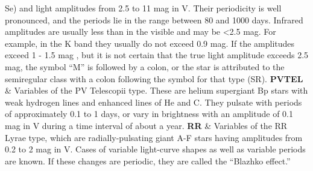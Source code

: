 \begin{longtabu}
Se) and light amplitudes from 2.5 to 11 mag in V. Their periodicity is
well pronounced, and the periods lie in the range between 80 and 1000
days. Infrared amplitudes are usually less than in the visible and may
be \textless{}2.5 mag. For example, in the K band they usually do not
exceed 0.9 mag. If the amplitudes exceed 1 - 1.5 mag , but it is not
certain that the true light amplitude exceeds 2.5 mag, the symbol ``M''
is followed by a colon, or the star is attributed to the semiregular
class with a colon following the symbol for that type
(SR).\tabularnewline
\midrule
\textbf{PVTEL} & Variables of the PV Telescopii type. These are helium
supergiant Bp stars with weak hydrogen lines and enhanced lines of He
and C. They pulsate with periods of approximately 0.1 to 1 days, or vary
in brightness with an amplitude of 0.1 mag in V during a time interval
of about a year.\tabularnewline
\midrule
\textbf{RR} & Variables of the RR Lyrae type, which are
radially-pulsating giant A-F stars having amplitudes from 0.2 to 2 mag
in V. Cases of variable light-curve shapes as well as variable periods
are known. If these changes are periodic, they are called the ``Blazhko
effect.''


\end{longtabu}
